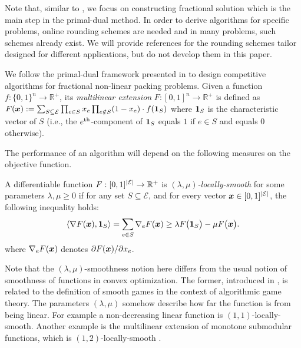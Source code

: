 Note that, similar to \cite{BamasMaggiori20:The-Primal-Dual-method}, we focus on constructing fractional solution 
which is the main step in the primal-dual method. In order to derive algorithms for specific problems, online rounding schemes 
are needed and in many problems, such schemes already exist. We will provide references for the rounding schemes
tailor designed for different applications, but do not develop them in this paper.

We follow the primal-dual framework presented in \cite{Thang20:Online-Primal-Dual} to design competitive algorithms for fractional non-linear packing problems.
Given a function $f: \{0,1\}^{n} \rightarrow \mathbb{R}^{+}$, its \emph{multilinear extension} $F: [0,1]^{n} \rightarrow \mathbb{R}^{+}$ 
is defined as $F(\bm{x}) := \sum_{S \subseteq \mathcal{E}} \prod_{e \in S} x_{e} \prod_{e \notin S} (1 - x_{e}) \cdot f(\bm{1}_{S})$
where $\bm{1}_{S}$ is the characteristic vector of $S$ (i.e., the $e^{\textnormal{th}}$-component of 
$\bm{1}_{S}$ equals $1$ if $e \in S$ and equals 0 otherwise). 

The performance of an algorithm will depend on the following measures on the objective function.  

\begin{definition}	\label{def:max-local-smooth}
A differentiable function $F: [0,1]^{|\cal E|} \rightarrow \mathbb{R}^{+}$ is \emph{$(\lambda,\mu)$-locally-smooth} for some parameters $\lambda,\mu\geq 0$
if for any set $S \subseteq \mathcal{E}$, and for every vector $\bm{x} \in [0,1]^{|\cal E|}$, 
the following inequality holds:
$$
\langle \nabla F(\bm{x}), \bm{1}_{S} \rangle = 
\sum_{e \in S} \nabla_{e} F(\bm{x}) \geq \lambda F\bigl( \bm{1}_{S} \bigr) - \mu F\bigl( \bm{x} \bigr).
$$
where $\nabla_{e} F(\bm{x})$ denotes $\partial F(\bm{x})/\partial x_{e}$.
\end{definition}

Note that the $(\lambda,\mu)$-smoothness notion here differs from the usual notion of smoothness of functions in
convex optimization. The former, introduced in \cite{Thang20:Online-Primal-Dual}, is related to the definition of 
smooth games \cite{Roughgarden15:Intrinsic-Robustness}   
in the context of algorithmic game theory. The parameters $(\lambda,\mu)$ somehow describe how far 
the function is from being linear. For example a non-decreasing linear function is $(1,1)$-locally-smooth.  Another example is the multilinear extension of monotone submodular functions, which is $(1,2)$-locally-smooth \cite{Thang20:Online-Primal-Dual}.

